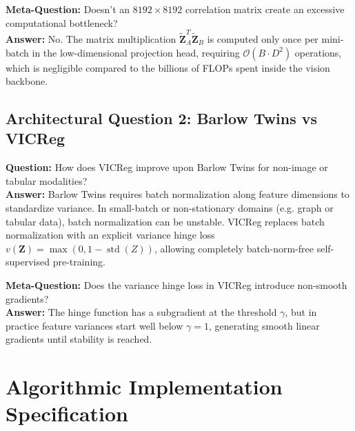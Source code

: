 \documentclass[11pt,a4paper]{article}
\theoremstyle{definition}
\begin{document}
\textbf{Meta-Question:} Doesn't an $8192 \times 8192$ correlation matrix create an excessive computational bottleneck?\\
\textbf{Answer:} No. The matrix multiplication $\tilde{\mathbf{Z}}_A^T \tilde{\mathbf{Z}}_B$ is computed only once per mini-batch in the low-dimensional projection head, requiring $\mathcal{O}(B \cdot D^2)$ operations, which is negligible compared to the billions of FLOPs spent inside the vision backbone.

\subsection{Architectural Question 2: Barlow Twins vs VICReg}
\textbf{Question:} How does VICReg improve upon Barlow Twins for non-image or tabular modalities?\\
\textbf{Answer:} Barlow Twins requires batch normalization along feature dimensions to standardize variance. In small-batch or non-stationary domains (e.g. graph or tabular data), batch normalization can be unstable. VICReg replaces batch normalization with an explicit variance hinge loss $v(\mathbf{Z}) = \max(0, 1 - \operatorname{std}(Z))$, allowing completely batch-norm-free self-supervised pre-training.

\textbf{Meta-Question:} Does the variance hinge loss in VICReg introduce non-smooth gradients?\\
\textbf{Answer:} The hinge function has a subgradient at the threshold $\gamma$, but in practice feature variances start well below $\gamma = 1$, generating smooth linear gradients until stability is reached.

\section{Algorithmic Implementation Specification}
\end{document}
